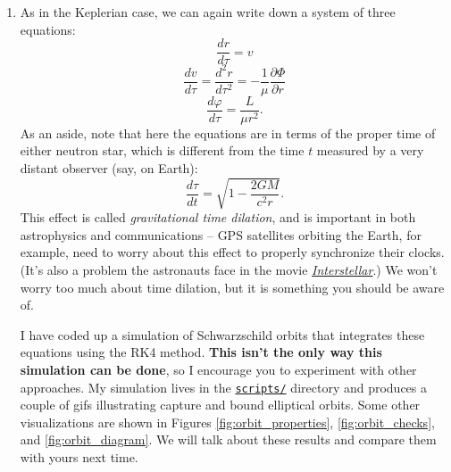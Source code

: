 \documentclass[11pt]{article}
\begin{document}
\begin{enumerate}
\item As in the Keplerian case, we can again write down a system of three equations:
\[ \frac{dr}{d\tau} = v \]
\[ \frac{dv}{d\tau} = \frac{d^2 r}{d\tau^2} = -\frac{1}{\mu}\frac{\partial\Phi}{\partial r} \]
\[ \frac{d\varphi}{d\tau} = \frac{L}{\mu r^2}. \]
As an aside, note that here the equations are in terms of the proper time of either neutron star, which is different from the time $t$ measured by a very distant observer (say, on Earth):
\[ \frac{d\tau}{dt} = \sqrt{1 - \frac{2GM}{c^2 r}}. \]
This effect is called \textit{gravitational time dilation}, and is important in both astrophysics and communications -- GPS satellites orbiting the Earth, for example, need to worry about this effect to properly synchronize their clocks. (It's also a problem the astronauts face in the movie \href{https://youtu.be/nOipaf5Rt9o}{\textit{Interstellar}}.) We won't worry too much about time dilation, but it is something you should be aware of.

\hspace{15pt} I have coded up a simulation of Schwarzschild orbits that integrates these equations using the RK4 method. \textbf{This isn't the only way this simulation can be done}, so I encourage you to experiment with other approaches. My simulation lives in the \href{https://github.com/alurban/mentoring/blob/master/tidal_distortion/scripts/schwarzschild_orbits_rk4.py}{\texttt{scripts/}} directory and produces a couple of gifs illustrating capture and bound elliptical orbits. Some other visualizations are shown in Figures \ref{fig:orbit_properties}, \ref{fig:orbit_checks}, and \ref{fig:orbit_diagram}. We will talk about these results and compare them with yours next time.


\end{enumerate}
\end{document}
